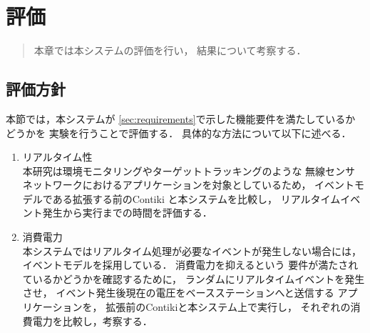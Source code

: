 \chapter{評価}
\begin{large}
\begin{quote}
本章では本システムの評価を行い，
結果について考察する．
\end{quote}
\end{large}
\clearpage

\section{評価方針}
本節では，本システムが
\ref{sec:requirements}で示した機能要件を満たしているかどうかを
実験を行うことで評価する．
具体的な方法について以下に述べる．


\begin{enumerate}
\item{リアルタイム性}\\
本研究は環境モニタリングやターゲットトラッキングのような
無線センサネットワークにおけるアプリケーションを対象としているため，
イベントモデルである拡張する前のContiki\cite{Dunkels:2004:CLF:1032658.1034117}
と本システムを比較し，
リアルタイムイベント発生から実行までの時間を評価する．
\newline
\item{消費電力}\\
本システムではリアルタイム処理が必要なイベントが発生しない場合には，
イベントモデルを採用している．
消費電力を抑えるという
要件が満たされているかどうかを確認するために，
ランダムにリアルタイムイベントを発生させ，
イベント発生後現在の電圧をベースステーションへと送信する
アプリケーションを，
拡張前のContikiと本システム上で実行し，
それぞれの消費電力を比較し，考察する．
\end{enumerate}




%



